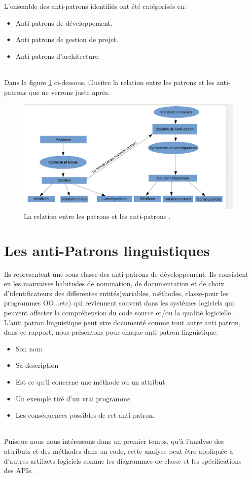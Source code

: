 L'ensemble des anti-patrons identifiés ont été catégorisés en\cite{brown1998antipatterns}:
\begin{itemize}
\item Anti patrons de développement.
\item Anti patrons de gestion de projet.
\item Anti patrons d’architecture.

   \end{itemize}
\\
Dans la figure \ref{fig:patanti} ci-dessous, \cite{brown1998antipatterns} illusitre la relation entre les patrons et les anti-patrons que ne verrons juste aprés.
\begin{figure}[H]
	\centering
\includegraphics[width=0.9\linewidth]{Others/Resources/patronetantipatron.png}
	\caption{La relation entre les patrons et les anti-patrons \cite{brown1998antipatterns}.}
		\label{fig:patanti}
	\end{figure}
\section{Les anti-Patrons linguistiques}

\label{aplinguistique}
Ils representent une sous-classe des anti-patrons de développement. Ils consistent en les mauvaises habitudes de nomination, de documentation et de choix d’identificateurs  des differentes entités(variables, méthodes, classe-pour les programmes OO...etc) qui reviennent souvent dans les systèmes logiciels qui peuvent affecter la compréhension du code source et/ou la qualité logicielle \cite{brown1998antipatterns}.
L’anti patron linguistique peut etre documenté comme tout autre anti patron, dans ce rapport, nous présentons pour chaque anti-patron linguistique:
\begin{itemize}
\item Son nom
\item Sa description
\item Est ce qu’il concerne une méthode ou un attribut
\item Un exemple tiré d’un vrai programme 
\item Les conséquences possibles de cet anti-patron.
\end{itemize}\\
Puisque nous nous intéressons dans un premier temps, qu’à l’analyse  des attributs et des méthodes dans un code, cette analyse peut être appliquée à d’autres artifacts logiciels comme les diagrammes de classe et les spécifications des APIs.\\

